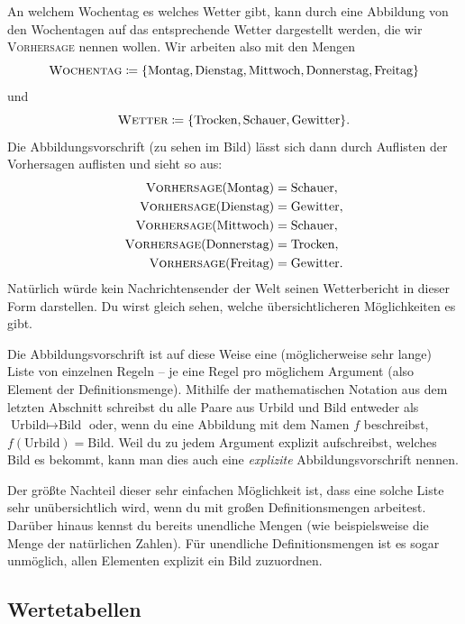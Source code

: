 \documentclass[../../main.tex]{subfiles}
\begin{document}
\begin{example}{}
    An welchem Wochentag es welches Wetter gibt, kann durch eine Abbildung von den Wochentagen auf das entsprechende Wetter dargestellt werden, die wir \textsc{Vorhersage} nennen wollen. Wir arbeiten also mit den Mengen \[\textsc{Wochentag}\coloneqq\{\text{Montag},\text{Dienstag},\text{Mittwoch},\text{Donnerstag},\text{Freitag}\}\] und \[\textsc{Wetter}\coloneqq\{\text{Trocken},\text{Schauer},\text{Gewitter}\}.\]
    Die Abbildungsvorschrift (zu sehen im Bild) lässt sich dann durch Auflisten der Vorhersagen auflisten und sieht so aus:
    \begin{align*}
        \textsc{Vorhersage}(\text{Montag})&=\text{Schauer},\\ \textsc{Vorhersage}(\text{Dienstag})&=\text{Gewitter},\\ \textsc{Vorhersage}(\text{Mittwoch})&=\text{Schauer},\\ \textsc{Vorhersage}(\text{Donnerstag})&=\text{Trocken},\\ \textsc{Vorhersage}(\text{Freitag})&=\text{Gewitter}.
    \end{align*}
    Natürlich würde kein Nachrichtensender der Welt seinen Wetterbericht in dieser Form darstellen. Du wirst gleich sehen, welche übersichtlicheren Möglichkeiten es gibt.
\end{example}

Die Abbildungsvorschrift ist auf diese Weise eine (möglicherweise sehr lange) Liste von einzelnen Regeln -- je eine Regel pro möglichem Argument (also Element der Definitionsmenge).
Mithilfe der mathematischen Notation aus dem letzten Abschnitt schreibst du alle Paare aus Urbild und Bild entweder als \mbox{$\text{Urbild}\mapsto\text{Bild}$} oder, wenn du eine Abbildung mit dem Namen $f$ beschreibst, \mbox{$f(\text{Urbild})=\text{Bild}$}. Weil du zu jedem Argument explizit aufschreibst, welches Bild es bekommt, kann man dies auch eine \emph{explizite} Abbildungsvorschrift nennen.

Der größte Nachteil dieser sehr einfachen Möglichkeit ist, dass eine solche Liste sehr unübersichtlich wird, wenn du mit großen Definitionsmengen arbeitest. Darüber hinaus kennst du bereits unendliche Mengen (wie beispielsweise die Menge \Natural{} der natürlichen Zahlen). Für unendliche Definitionsmengen ist es sogar unmöglich, allen Elementen explizit ein Bild zuzuordnen.

\subsection{Wertetabellen}
\label{sec:abbildungen_wertetabellen}
\end{document}
